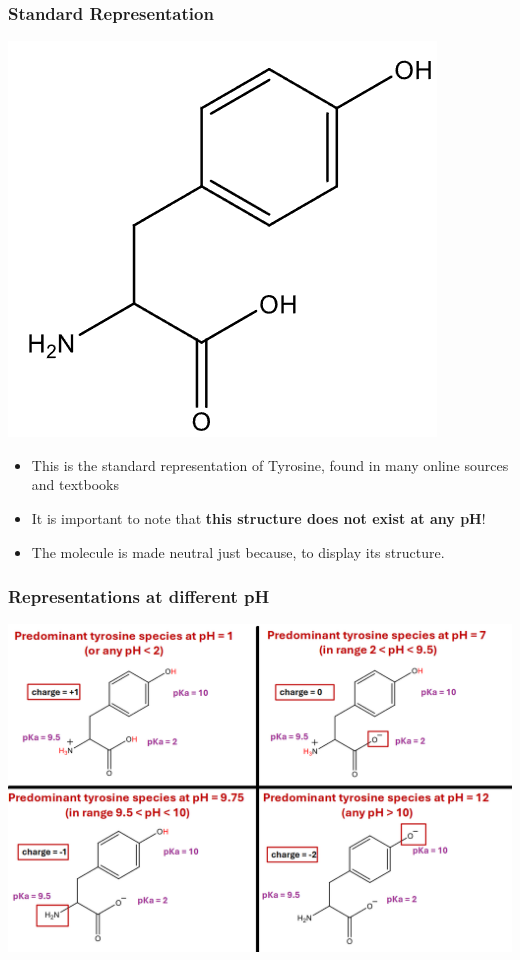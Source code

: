 \documentclass[10pt]{article}
\begin{document}
\subsubsection*{Standard Representation}
\begin{center}
\includegraphics*[scale=0.8]{L2_4.png}
\end{center}
\begin{itemize}
    \item This is the standard representation of Tyrosine, found in many online sources and textbooks
    \item It is important to note that \textbf{this structure does not exist at any pH}!
    \item The molecule is made neutral just because, to display its structure.
\end{itemize}
\subsubsection*{Representations at different pH}
\begin{center}
    \includegraphics*[width=\textwidth]{L2_5.png}
\end{center}
\end{document}
